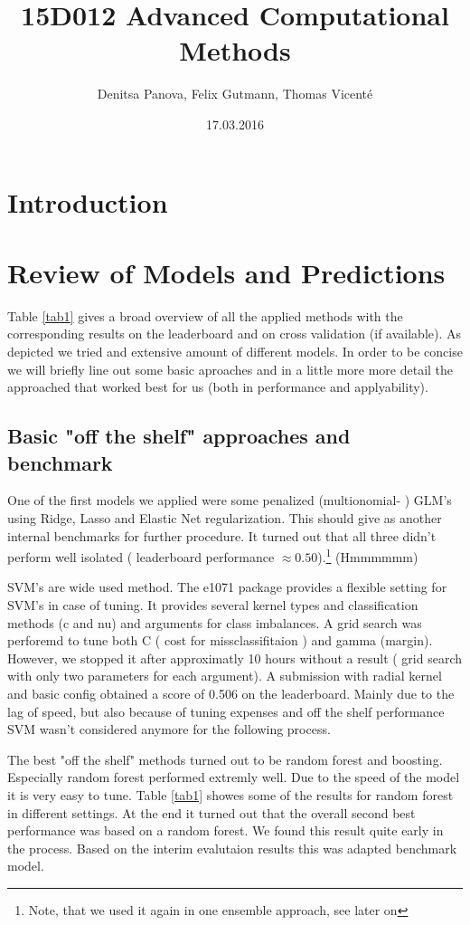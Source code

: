 \documentclass[fleqn]{article}
\title{15D012 Advanced Computational Methods}
\author{Denitsa Panova, Felix Gutmann, Thomas Vicenté}
\date{17.03.2016}
\begin{document}
\maketitle

\section{Introduction}

\lipsum[2-4]

\section{Review of Models and Predictions}

Table \ref{tab1} gives a broad overview of all the applied methods with the corresponding results on the leaderboard and on cross validation (if available). As depicted we tried and extensive amount of different models. In order to be concise we will briefly line out some basic aproaches and in a little more more detail the approached that worked best for us (both in performance and applyability).

\subsection{Basic "off the shelf" approaches and benchmark}

One of the first models we applied were some penalized (multionomial- ) GLM's using Ridge, Lasso and Elastic Net regularization. This should give as another internal benchmarks for further procedure.  It turned out that all three  didn't perform well isolated ( leaderboard performance $\approx 0.50$).\footnote{Note, that we used it again in one ensemble approach, see later on} (Hmmmmmm)

SVM's are wide used method. The e1071 package provides a flexible setting for SVM's in case of tuning. It provides several kernel types and classification methods (c and nu) and arguments for class imbalances. A grid search was perforemd to tune both C ( cost for missclassifitaion ) and gamma (margin). However, we stopped it after approximatly 10 hours without a result ( grid search with only two parameters for each argument). A submission with radial kernel and basic config obtained a score of 0.506 on the leaderboard.  Mainly due to the lag of speed, but also because of tuning expenses and off the shelf performance SVM wasn't considered anymore for the following process. 

The best "off the shelf" methods turned out to be random forest and boosting. Especially random forest performed extremly well. Due to the speed of the model it is very easy to tune. Table \ref{tab1} showes some of the results for random forest in different settings. At the end it turned out that the overall second best performance was based on a random forest. We found this result quite early in the process. Based on the interim evalutaion results this was adapted benchmark model. 
\end{document}
